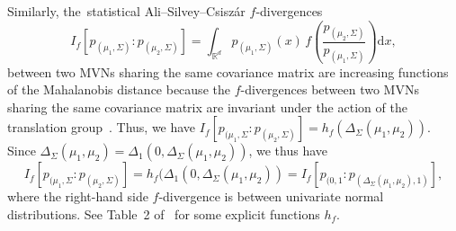 \documentclass[entropy,article,accept,oneauthor,pdftex,entropy]{Definitions/mdpi}
\def\arccosh{\mathrm{arccosh}}
\def\bbR{\mathbb{R}}
\def\calN{\mathcal{N}}
\def\st{\ :\ }
\def\bbR{\mathbb{R}}
\begin{document}
Similarly, the~statistical Ali–Silvey–Csisz\'ar $f$-divergences~\cite{fdiv-AliSilvey-1966,Csiszar-1967}
$$
I_f[p_{(\mu_1,\Sigma)}:p_{(\mu_2,\Sigma)}]=\int_{\bbR^d}  p_{(\mu_1,\Sigma)}(x)\, f\left(\frac{ p_{(\mu_2,\Sigma)}}{ p_{(\mu_1,\Sigma)}}\right)  \mathrm{d}x,
$$
between two MVNs sharing the same covariance matrix are increasing functions of the Mahalanobis distance because the $f$-divergences between two MVNs sharing the same covariance matrix are invariant under the action of the translation group~\cite{nielsen2022note}. Thus, we have 
$I_f[p_{(\mu_1,\Sigma}:p_{(\mu_2,\Sigma)}]=h_f(\Delta_\Sigma(\mu_1,\mu_2))$. 
Since $\Delta_\Sigma(\mu_1,\mu_2)=\Delta_1(0,\Delta_\Sigma(\mu_1,\mu_2))$, we thus have
$$
I_f[p_{(\mu_1,\Sigma}:p_{(\mu_2,\Sigma)}]=h_f(\Delta_1(0,\Delta_\Sigma(\mu_1,\mu_2))=I_f[p_{(0,1}:p_{(\Delta_\Sigma(\mu_1,\mu_2),1)}],
$$
where the right-hand side $f$-divergence is between univariate normal distributions.
See Table~2 of~\cite{nielsen2022note} for some explicit functions $h_f$.



\end{document}
